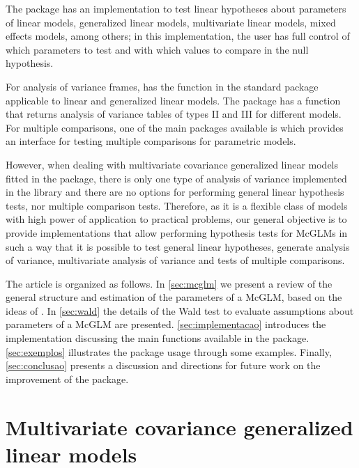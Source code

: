 \documentclass[article]{jss}\usepackage[]{graphicx}\usepackage[]{xcolor}
\begin{document}
The package  \citep{car} has an implementation to test linear hypotheses about parameters of linear models, generalized linear models, multivariate linear models, mixed effects models, among others; in this implementation, the user has full control of which parameters to test and with which values to compare in the null hypothesis.

For analysis of variance frames,  has the function  in the standard package  \citep{R2022} applicable to linear and generalized linear models. The package  \citep{car} has a function that returns analysis of variance tables of types II and III for different models. For multiple comparisons, one of the main packages available is  \citep{multcomp} which provides an interface for testing multiple comparisons for parametric models.

However, when dealing with multivariate covariance generalized linear models fitted in the  package, there is only one type of analysis of variance implemented in the library and there are no options for performing general linear hypothesis tests, nor multiple comparison tests. Therefore, as it is a flexible class of models with high power of application to practical problems, our general objective is to provide implementations that allow performing hypothesis tests for McGLMs in such a way that it is possible to test general linear hypotheses, generate analysis of variance, multivariate analysis of variance and tests of multiple comparisons.

The article is organized as follows. In \autoref{sec:mcglm} we present a review of the general structure and estimation of the parameters of a McGLM, based on the ideas of \citet{Bonat16}. In \autoref{sec:wald} the details of the Wald test to evaluate assumptions about parameters of a McGLM are presented. \autoref{sec:implementacao} introduces the  implementation discussing the main functions available in the  package. \autoref{sec:exemplos} illustrates the package usage through some examples. Finally, \autoref{sec:conclusao} presents a discussion and directions for future work on the improvement of the  package.


\section{Multivariate covariance generalized linear models}\label{sec:mcglm}
\end{document}
